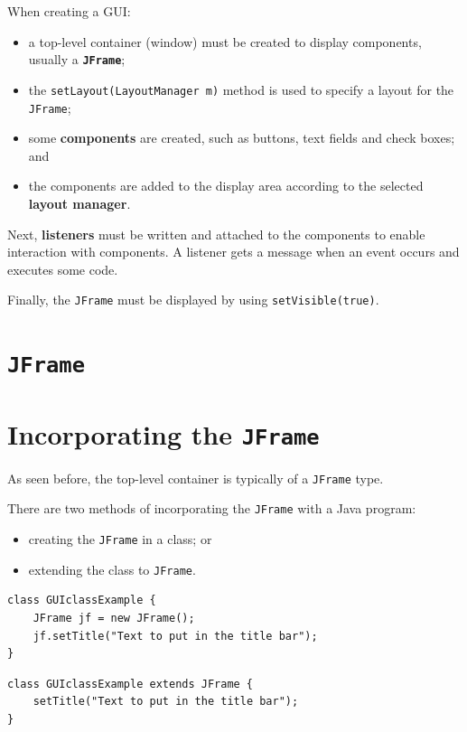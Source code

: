 \documentclass[a4paper]{systems-software}
\begin{document}
When creating a GUI:
\begin{itemize}
	\item a top-level container (window) must be created to display components, usually a\textbf{ \texttt{JFrame}};
	\item the \texttt{setLayout(LayoutManager m)} method is used to specify a layout for the \texttt{JFrame};
	\item some \textbf{components} are created, such as buttons, text fields and check boxes; and
	\item the components are added to the display area according to the selected \textbf{layout manager}.
\end{itemize}

Next, \textbf{listeners} must be written and attached to the components to enable interaction with components. A listener gets a message when an event occurs and executes some code.

Finally, the \texttt{JFrame} must be displayed by using \texttt{setVisible(true)}.


\section{\texttt{JFrame}}

\section*{Incorporating the \texttt{JFrame}}

As seen before, the top-level container is typically of a \texttt{JFrame} type.

There are two methods of incorporating the \texttt{JFrame} with a Java program:
\begin{itemize}
	\item creating the \texttt{JFrame} in a class; or
	\item extending the class to \texttt{JFrame}.
\end{itemize}

\begin{lstlisting}[title={Creating a JFrame in a class.}]
class GUIclassExample {
	JFrame jf = new JFrame();
	jf.setTitle("Text to put in the title bar");
}
\end{lstlisting}

\newpage

\begin{lstlisting}[title={Extending a class to JFrame.}]
class GUIclassExample extends JFrame {
	setTitle("Text to put in the title bar");
}
\end{lstlisting}
\end{document}
